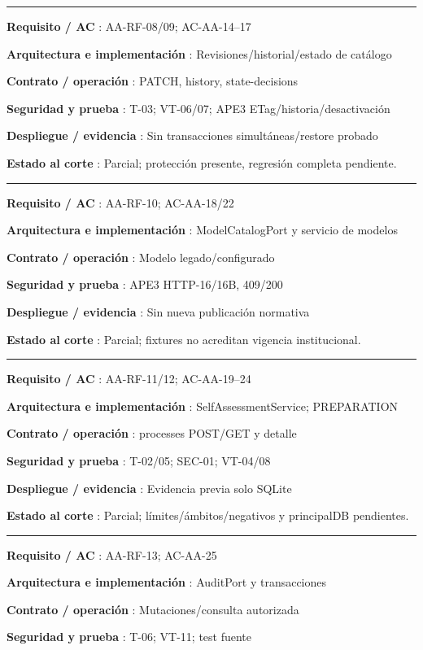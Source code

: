 \documentclass[12pt,a4paper]{report}
\begin{document}
\medskip\hrule\medskip

\textbf{Requisito / AC }: AA-RF-08/09; AC-AA-14--17

\textbf{Arquitectura e implementación }: Revisiones/historial/estado de
catálogo

\textbf{Contrato / operación }: PATCH, history, state-decisions

\textbf{Seguridad y prueba }: T-03; VT-06/07; APE3
ETag/historia/desactivación

\textbf{Despliegue / evidencia }: Sin transacciones simultáneas/restore
probado

\textbf{Estado al corte }: Parcial; protección presente, regresión
completa pendiente.

\medskip\hrule\medskip

\textbf{Requisito / AC }: AA-RF-10; AC-AA-18/22

\textbf{Arquitectura e implementación }: ModelCatalogPort y servicio de
modelos

\textbf{Contrato / operación }: Modelo legado/configurado

\textbf{Seguridad y prueba }: APE3 HTTP-16/16B, 409/200

\textbf{Despliegue / evidencia }: Sin nueva publicación normativa

\textbf{Estado al corte }: Parcial; fixtures no acreditan vigencia
institucional.

\medskip\hrule\medskip

\textbf{Requisito / AC }: AA-RF-11/12; AC-AA-19--24

\textbf{Arquitectura e implementación }: SelfAssessmentService;
PREPARATION

\textbf{Contrato / operación }: processes POST/GET y detalle

\textbf{Seguridad y prueba }: T-02/05; SEC-01; VT-04/08

\textbf{Despliegue / evidencia }: Evidencia previa solo SQLite

\textbf{Estado al corte }: Parcial; límites/ámbitos/negativos y
principalDB pendientes.

\medskip\hrule\medskip

\textbf{Requisito / AC }: AA-RF-13; AC-AA-25

\textbf{Arquitectura e implementación }: AuditPort y transacciones

\textbf{Contrato / operación }: Mutaciones/consulta autorizada

\textbf{Seguridad y prueba }: T-06; VT-11; test fuente
\end{document}
